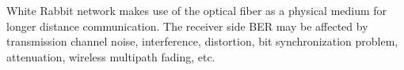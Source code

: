 White Rabbit network makes use of the optical fiber as a physical medium for longer distance communication. The receiver side BER may be affected by transmission
channel noise, interference, distortion, bit synchronization
problem, attenuation, wireless multipath fading, etc. 